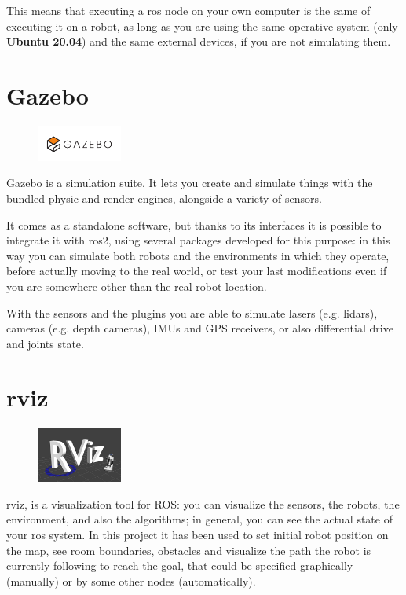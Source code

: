 This means that executing a \acrshort{ros} node on your own computer is the same of executing it on a robot, as long as you are using the same operative system (only \textbf{Ubuntu 20.04}) and the same external devices, if you are not simulating them.

\section{Gazebo}
\label{sec:gazebo} %

\begin{figure}
    \includegraphics[width=0.25\textwidth]{images/gazebo}
\end{figure}

Gazebo is a simulation suite. It lets you create and simulate things with the bundled physic and render engines, alongside a variety of sensors.

It comes as a standalone software, but thanks to its interfaces it is possible to integrate it with \acrshort{ros}2, using several packages developed for this purpose: in this way you can simulate both robots and the environments in which they operate, before actually moving to the real world, or test your last modifications even if you are somewhere other than the real robot location.

With the sensors and the plugins you are able to simulate lasers (e.g. lidars), cameras (e.g. depth cameras), IMUs and GPS receivers, or also differential drive and joints state.

\section{\acrfull{rviz}}

\begin{figure}
    \includegraphics[width=0.25\textwidth]{images/rviz}
\end{figure}

\Acrshort{rviz}, is a visualization tool for ROS: you can visualize the sensors, the robots, the environment, and also the algorithms; in general, you can see the actual state of your \acrshort{ros} system. In this project it has been used to set initial robot position on the map, see room boundaries, obstacles and visualize the path the robot is currently following to reach the goal, that could be specified graphically (manually) or by some other nodes (automatically). 

